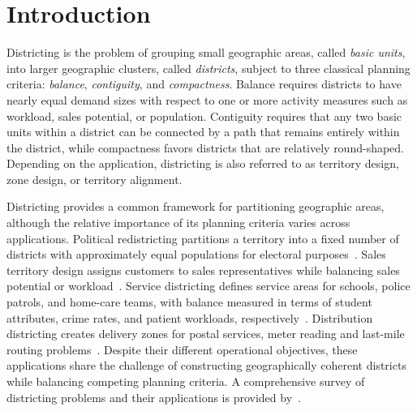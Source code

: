 \documentclass[preprint,12pt,authoryear]{elsarticle}
\theoremstyle{definition}
\begin{document}
\section{Introduction}
\label{sec:intro}

Districting is the problem of grouping small geographic areas, called
\emph{basic units}, into larger geographic clusters, called \emph{districts}, 
subject to three classical planning criteria: \emph{balance}, \emph{contiguity}, 
and \emph{compactness}. Balance requires districts to have nearly equal demand sizes 
with respect to one or more activity measures such as workload, sales 
potential, or population. Contiguity requires that any two basic units within a 
district can be connected by a path that remains entirely within the district, 
while compactness favors districts that are relatively round-shaped. Depending on 
the application,  districting is also referred to as territory design, zone design, 
or territory alignment.


Districting provides a common framework for partitioning geographic areas, 
although the relative importance of its planning criteria varies across 
applications. Political redistricting partitions a territory into a fixed 
number of districts with approximately equal populations for electoral 
purposes~\citep{ricca2013political}. Sales territory design assigns customers 
to sales representatives while balancing sales potential or 
workload~\citep{kalcsics2005towards}. Service districting defines service areas 
for schools, police patrols, and home-care teams, with balance measured in terms 
of student attributes, crime rates, and patient workloads, 
respectively~\citep{blais2003solving, camacho2015multi, bouzarth2018assigning}. 
Distribution districting creates delivery zones for postal services, meter reading 
and last-mile routing problems~\citep{ramirez2023reconfiguration, de2014redistricting, 
sandoval2022novel}. Despite their different operational objectives, these 
applications share the challenge of constructing geographically coherent districts 
while balancing competing planning criteria. A comprehensive survey of districting 
problems and their applications is provided by~\citet{CAMPOSVALDES2026103654}.
\end{document}
